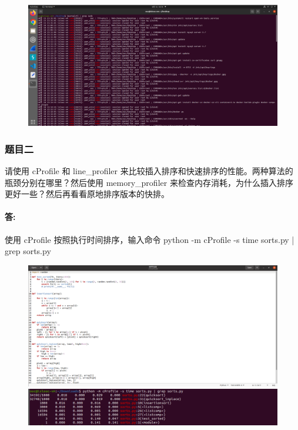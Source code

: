 \documentclass[a4paper, 12pt]{article}
\begin{document}
	\begin{figure}[H]
		\centering
		\includegraphics[width=1\textwidth]{001.jpg}
	\end{figure}
	

	\subsubsection{题目二}
	请使用 cProfile 和 line\_profiler 来比较插入排序和快速排序的性能。两种算法的瓶颈分别在哪里？然后使用 memory\_profiler 来检查内存消耗，为什么插入排序更好一些？然后再看看原地排序版本的快排。
	
	\paragraph{答:}
	使用 cProfile 按照执行时间排序，输入命令  python -m cProfile -s time sorts.py | grep sorts.py
		
	\begin{figure}[H]
		\centering
		\includegraphics[width=1\textwidth]{002.jpg}
		\includegraphics[width=1\textwidth]{003.jpg}
	\end{figure}
	
\end{document}
